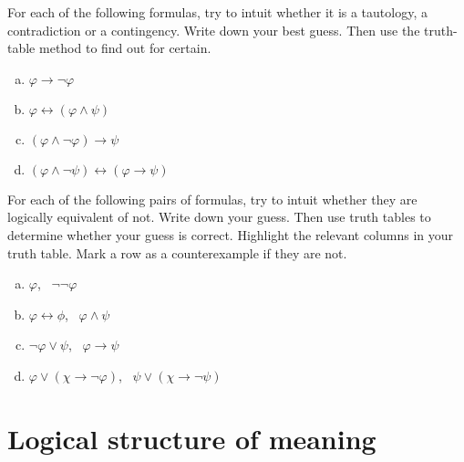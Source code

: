 \documentclass[nobib,nofonts]{tufte-handout}
\begin{document}
\bigskip
\noindent \colorbox{mygray}{\centering
  \begin{minipage}{1.0\textwidth}

    \begin{exercise}
      For each of the following formulas, try to intuit whether it is a tautology, a contradiction or a contingency. Write down your best guess. Then use the truth-table method to find out for certain.
      \begin{multicols}{2}
        \begin{enumerate}[a.]
          \item $\varphi \rightarrow \neg \varphi$
          \item $\varphi \leftrightarrow (\varphi \wedge \psi)$
          \item $(\varphi \wedge \neg \varphi) \rightarrow \psi$
          \item $(\varphi \wedge \neg \psi) \leftrightarrow (\varphi \rightarrow \psi)$
        \end{enumerate}
      \end{multicols}
    \end{exercise}

    \begin{exercise}
      For each of the following pairs of formulas, try to intuit whether they are logically equivalent of not. Write down your guess. Then use truth tables to determine whether your guess is correct. Highlight the relevant columns in your truth table. Mark a row as a counterexample if they are not.
      \begin{multicols}{2}
        \begin{enumerate}[a.]
          \item $\varphi$, \ $\neg \neg \varphi$
          \item $\varphi \leftrightarrow \phi$, \ $\varphi \wedge \psi$
          \item $\neg \varphi \vee  \psi$, \  $\varphi \rightarrow \psi$
          \item $\varphi \vee (\chi \rightarrow \neg \varphi)$, \ $\psi \vee (\chi \rightarrow \neg \psi)$
        \end{enumerate}
      \end{multicols}
    \end{exercise}

  \end{minipage}
}

\newpage

\section{Logical structure of meaning}
\label{sec:excav-prop-logic}
\end{document}
